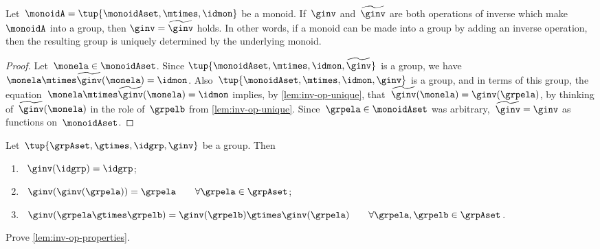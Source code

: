 \begin{corollary}
 \label{cor:inv-op-unique}
Let~$\monoidA = \tup{\monoidAset, \mtimes,  \idmon }$ be a monoid.
 If~$\ginv$ and~$\widetilde \ginv$ are both operations of inverse which make$\monoidA$ into a group, then $\ginv = \widetilde \ginv$ holds.
 In other words, if a monoid can be made into a group by adding an inverse operation, then the resulting group is uniquely determined by the underlying monoid.
\end{corollary}

\begin{proof}
Let~$\monela \in \monoidAset$.
Since $\tup{\monoidAset, \mtimes,  \idmon, \widetilde \ginv }$ is a group, we have~$\monela \mtimes  \widetilde \ginv(\monela) = \idmon$.
Also~$\tup{\monoidAset, \mtimes,  \idmon, \ginv }$ is a group, and in terms of this group, the equation~$\monela \mtimes  \widetilde \ginv(\monela) = \idmon$ implies, by \cref{lem:inv-op-unique}, that~$\widetilde \ginv(\monela) = \ginv(\grpela)$, by thinking of~$\widetilde \ginv(\monela)$ in the role of~$\grpelb$ from \cref{lem:inv-op-unique}.
Since~$\grpela \in \monoidAset$ was arbitrary,~$\widetilde \ginv = \ginv$ as functions on~$\monoidAset$.
\end{proof}


\begin{lemma}
  \label{lem:inv-op-properties}
  Let~$\tup{\grpAset, \gtimes, \idgrp, \ginv}$ be a group. Then
  \begin{enumerate}
    \item\label{eq:group-neutral-invariant}~$\ginv(\idgrp) = \idgrp$;
    \item\label{eq:group-inverse-inverse}~$ \ginv(\ginv(\grpela)) = \grpela \qquad \forall \grpela \in \grpAset$;
    \item\label{eq:group-inverse-of-composition}~$\ginv(\grpela \gtimes \grpelb ) = \ginv(\grpelb) \gtimes \ginv(\grpela) \qquad \forall \grpela, \grpelb \in \grpAset$.
  \end{enumerate}
\end{lemma}

\begin{gradedexercise}\label{ex:GroupInverseProperties}
  Prove \cref{lem:inv-op-properties}.
\end{gradedexercise}

